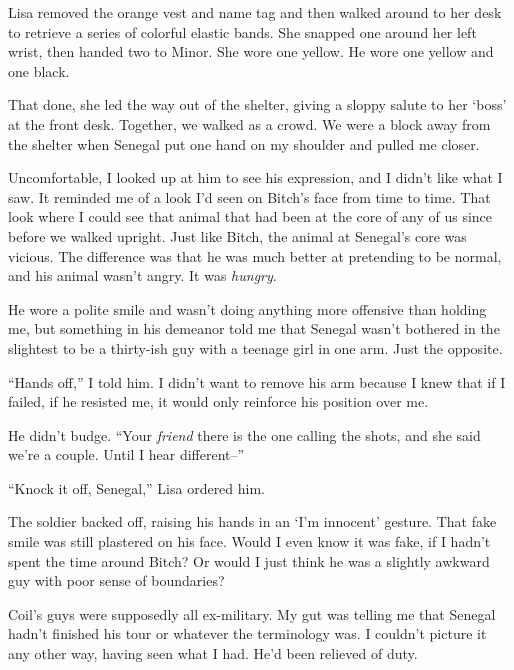 Lisa removed the orange vest and name tag and then walked around to her desk to retrieve a series of colorful elastic bands.  She snapped one around her left wrist, then handed two to Minor.  She wore one yellow.  He wore one yellow and one black.



That done, she led the way out of the shelter, giving a sloppy salute to her `boss' at the front desk.  Together, we walked as a crowd.  We were a block away from the shelter when Senegal put one hand on my shoulder and pulled me closer.



Uncomfortable, I looked up at him to see his expression, and I didn't like what I saw.  It reminded me of a look I'd seen on Bitch's face from time to time.  That look where I could see that animal that had been at the core of any of us since before we walked upright.  Just like Bitch, the animal at Senegal's core was vicious.  The difference was that he was much better at pretending to be normal, and his animal wasn't angry.  It was \emph{hungry}.



He wore a polite smile and wasn't doing anything more offensive than holding me, but something in his demeanor told me that Senegal wasn't bothered in the slightest to be a thirty-ish guy with a teenage girl in one arm.  Just the opposite.



``Hands off,'' I told him.  I didn't want to remove his arm because I knew that if I failed, if he resisted me, it would only reinforce his position over me.



He didn't budge.  ``Your \emph{friend} there is the one calling the shots, and she said we're a couple.  Until I hear different--''



``Knock it off, Senegal,'' Lisa ordered him.



The soldier backed off, raising his hands in an `I'm innocent' gesture.  That fake smile was still plastered on his face.  Would I even know it was fake, if I hadn't spent the time around Bitch?  Or would I just think he was a slightly awkward guy with poor sense of boundaries?



Coil's guys were supposedly all ex-military.  My gut was telling me that Senegal hadn't finished his tour or whatever the terminology was.  I couldn't picture it any other way, having seen what I had.  He'd been relieved of duty.




